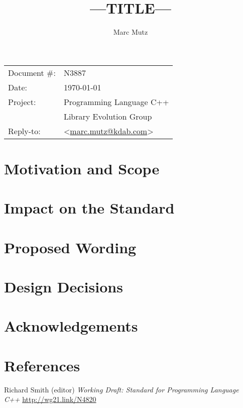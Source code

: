 \documentclass[11pt]{article}
\date{}
\title{---TITLE---}
\makeatletter
\newcommand{\emailaddress}{marc.mutz@kdab.com}
\newcommand{\email}{\href{mailto:\emailaddress}{\emailaddress}}
\makeatother
\begin{document}
\maketitle\vspace{-2cm}

\begin{tabular}{ll}
  Document \#:&N3887\\
  Date:       &\today\\
  Project:    &Programming Language C++\\
              &Library Evolution Group\\
  Reply-to:   &\author{Marc Mutz} \textless\email\textgreater
\end{tabular}
\vspace{1cm}
\begin{abstract}

\end{abstract}

\tableofcontents

\section{Motivation and Scope}

\section{Impact on the Standard}

\section{Proposed Wording}

\section{Design Decisions}

\section{Acknowledgements}

\section{References}
\renewcommand{\section}[2]{}%
\begin{thebibliography}{9}
  Richard Smith (editor)\newline
  \emph{Working Draft: Standard for Programming Language C++}\newline
  \url{http://wg21.link/N4820}
\end{thebibliography}
\end{document}
